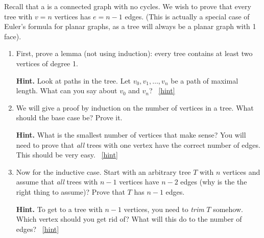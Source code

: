 \documentclass{book}
\begin{document}
\setcounter{project}{23}
\addtocounter{project}{-1}
\begin{activity}[]\label{activity-18}
\hypertarget{p-256}{}%
Recall that a  is a connected graph with no cycles.  We wish to prove that every tree with \(v = n\) vertices has \(e = n-1\) edges.  (This is actually a special case of Euler's formula for planar graphs, as a tree will always be a planar graph with 1 face).%
\begin{enumerate}[font=\bfseries,label=(\alph*),ref=\alph*]
\item\label{task-28} \hypertarget{p-257}{}%
First, prove a lemma (not using induction): every tree contains at least two vertices of degree 1.%
\par\smallskip%
\noindent\textbf{Hint.}\hypertarget{hint-4}{}\quad%
\hypertarget{p-258}{}%
Look at paths in the tree.  Let \(v_0, v_1, \ldots, v_n\) be a path of maximal length.  What can you say about \(v_0\) and \(v_n\)?%
~\hfill{\tiny\hyperlink{a-23.a}{[hint]}\hypertarget{q-23.a}{}}\item\label{task-29} \hypertarget{p-259}{}%
We will give a proof by induction on the number of vertices in a tree.  What should the base case be?  Prove it.%
\par\smallskip%
\noindent\textbf{Hint.}\hypertarget{hint-5}{}\quad%
\hypertarget{p-260}{}%
What is the smallest number of vertices that make sense?  You will need to prove that \emph{all} trees with one vertex have the correct number of edges.  This should be very easy.%
~\hfill{\tiny\hyperlink{a-23.b}{[hint]}\hypertarget{q-23.b}{}}\item\label{task-30} \hypertarget{p-261}{}%
Now for the inductive case.  Start with an arbitrary tree \(T\) with \(n\) vertices and assume that \emph{all} trees with \(n-1\) vertices have \(n-2\) edges (why is the the right thing to assume)?  Prove that \(T\) has \(n-1\) edges.%
\par\smallskip%
\noindent\textbf{Hint.}\hypertarget{hint-6}{}\quad%
\hypertarget{p-262}{}%
To get to a tree with \(n-1\) vertices, you need to \emph{trim} \(T\) somehow.  Which vertex should you get rid of?  What will this do to the number of edges?%
~\hfill{\tiny\hyperlink{a-23.c}{[hint]}\hypertarget{q-23.c}{}}\end{enumerate}
\end{activity}

\clearpage
\end{document}

